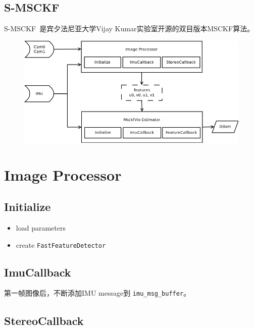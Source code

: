 \documentclass[12pt,a4paper]{article}
\begin{document}
\subsection{S-MSCKF}

S-MSCKF~\cite{sun2018robust}是宾夕法尼亚大学Vijay Kumar实验室开源的双目版本MSCKF算法。


\begin{figure}[!htbp]
\centering
\includegraphics[scale=0.5]{images/msckf_vio_io.png}
\end{figure}

\newpage
\section{Image Processor}

\subsection{Initialize}

\begin{itemize}
\item load parameters
\item create \verb|FastFeatureDetector|
\end{itemize}

\subsection{ImuCallback}

第一帧图像后，不断添加IMU message到 \verb|imu_msg_buffer|。

\subsection{StereoCallback}
\end{document}
